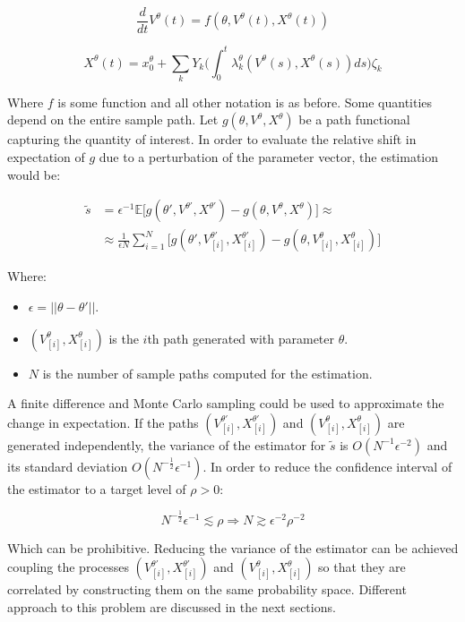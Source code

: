 $$\frac{d}{dt}V^\theta(t) = f(\theta, V^\theta(t), X^\theta(t))$$

$$X^\theta(t) = x_0^\theta + \sum\limits_kY_k\biggl(\int_0^t\lambda_k^\theta(V^\theta(s), X^\theta(s))ds\biggr)\zeta_k$$

Where $f$ is some function and all other notation is as before.
Some quantities depend on the entire sample path.
Let $g(\theta, V^\theta, X^\theta)$ be a path functional capturing the quantity of interest.
In order to evaluate the relative shift in expectation of $g$ due to a perturbation of the parameter vector, the estimation would be:


\begin{align*}
	\tilde{s} &=\epsilon^{-1}\mathbb{E}\bigl[g(\theta', V^{\theta'}, X^{\theta'})-g(\theta, V^\theta, X^\theta)\bigr]\approx\\
						&\approx\frac{1}{\epsilon N}\sum\limits_{i=1}^N\bigl[g(\theta', V_{[i]}^{\theta'}, X_{[i]}^{\theta'})-g(\theta, V_{[i]}^\theta, X_{[i]}^\theta)\bigr]
\end{align*}

Where:

\begin{itemize}
	\item $\epsilon= ||\theta-\theta'||$.
	\item $(V_{[i]}^\theta, X_{[i]}^{\theta})$ is the $i$th path generated with parameter $\theta$.
	\item $N$ is the number of sample paths computed for the estimation.
\end{itemize}

A finite difference and Monte Carlo sampling could be used to approximate the change in expectation.
If the paths $(V_{[i]}^{\theta'}, X_{[i]}^{\theta'})$ and $(V_{[i]}^\theta, X_{[i]}^{\theta})$ are generated independently, the variance of the estimator for $\tilde{s}$ is $O(N^{-1}\epsilon^{-2})$ and its standard deviation $O(N^{-\frac{1}{2}}\epsilon^{-1})$.
In order to reduce the confidence interval of the estimator to a target level of $\rho >0$:

$$N^{-\frac{1}{2}}\epsilon^{-1}\lesssim\rho\Rightarrow N \gtrsim\epsilon^{-2}\rho^{-2}$$

Which can be prohibitive.
Reducing the variance of the estimator can be achieved coupling the processes $(V_{[i]}^{\theta'}, X_{[i]}^{\theta'})$ and $(V_{[i]}^\theta, X_{[i]}^{\theta})$ so that they are correlated by constructing them on the same probability space.
Different approach to this problem are discussed in the next sections.

